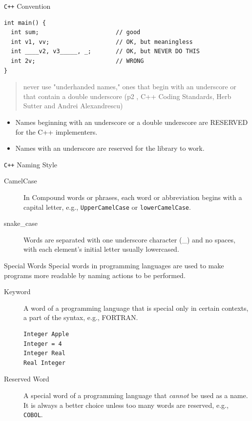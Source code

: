 \documentclass[presentation]{beamer}
\begin{document}
\begin{frame}[fragile,label={sec:orgheadline3}]{\texttt{C++} Convention}
 \begin{verbatim}
int main() {
  int sum;                      // good
  int v1, vv;                   // OK, but meaningless
  int ____v2, v3_____, _;       // OK, but NEVER DO THIS
  int 2v;                       // WRONG
}
\end{verbatim}

\begin{quote}
never use "underhanded names," ones that begin with an underscore
or that contain a double underscore (p2 , C++ Coding Standards,
Herb Sutter and Andrei Alexandrescu)
\end{quote}

\begin{itemize}
\item Names beginning with an underscore or a double underscore are
RESERVED for the C++ implementers.
\item Names with an underscore are reserved for the library to work.
\end{itemize}
\end{frame}

\begin{frame}[fragile,label={sec:orgheadline4}]{\texttt{C++} Naming Style}
 \begin{description}
\item[{CamelCase}] In Compound words or phrases, each word or
abbreviation begins with a capital letter, e.g.,
\texttt{UpperCamelCase} or \texttt{lowerCamelCase}.
\item[{snake\_case}] Words are separated with one underscore character
(\_) and no spaces, with each element's initial letter usually
lowercased.
\end{description}
\end{frame}

\begin{frame}[fragile,label={sec:orgheadline5}]{Special Words}
 Special words in programming languages are used to make programs
more readable by naming actions to be performed.

\begin{description}
\item[{Keyword}] A word of a programming language that is special only
in certain contexts, a part of the syntax, e.g., FORTRAN.

\begin{verbatim}
Integer Apple
Integer = 4
Integer Real
Real Integer
\end{verbatim}

\item[{Reserved Word}] A special word of a programming language that
\emph{cannot} be used as a name.  It is always a better choice
unless too many words are reserved, e.g., \texttt{COBOL}.
\end{description}
\end{frame}
\end{document}
